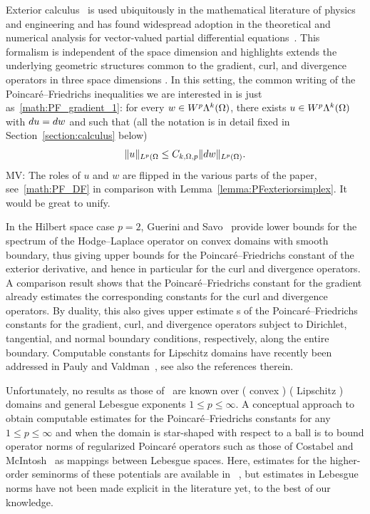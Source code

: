 \documentclass[10pt,a4paper]{article}
\newcommand\cye[1]{%
\protect\leavevmode
\begingroup
    \color{blue}%
    #1%
\endgroup
}
\newcommand{\mwl}[1]{{\color{red}#1}}
\begin{document}
Exterior calculus~\cite{greub1967multilinear,lee2012smooth} is used ubiquitously in the mathematical literature of physics and engineering and has found widespread adoption in the theoretical and numerical analysis for vector-valued partial differential equations~\cite{hiptmair2002finite, gross2004electromagnetic, arnold2006finite, arnold2009geometric, arnold2010finite, demlow2014posteriori, licht2021local, arnold2021complexes}. 
This formalism is independent of the \cye{space} dimension and highlights \cye{extends the} underlying geometric structures common to the gradient, curl, and divergence operators \cye{in three space dimensions}.
\cye{In this setting, the common writing of the Poincar\'e--Friedrichs inequalities we are interested in is just as~\eqref{math:PF_gradient_1}: for every $w \in W^{p}\Lambda^{k}(\Omega)$, there exists $u \in W^{p}\Lambda^{k}(\Omega)$ with $d u = d w$ and such that (all the notation is in detail fixed in Section~\ref{section:calculus} below)
\begin{align} \label{math:PF_DF} 
    \| u \|_{L^{p}(\Omega} \leq  C_{k,\Omega,p} \| d w \|_{L^{p}(\Omega)}.
\end{align} 
}\mwl{MV: The roles of $u$ and $w$ are flipped in the various parts of the paper, see~\eqref{math:PF_DF} in comparison with Lemma~\ref{lemma:PFexteriorsimplex}. It would be great to unify.}

In the Hilbert space case $p=2$, Guerini and Savo~\cite{guerini2004eigenvalue} provide lower bounds for the spectrum of the Hodge--Laplace operator on convex domains with smooth boundary, thus giving upper bounds for the Poincar\'e--Friedrichs constant of the exterior derivative, and hence \cye{in particular} for the curl and divergence operators.
\cye{A comparison result} shows that the Poincar\'e--Friedrichs constant for the gradient already estimates the corresponding constants for the curl and divergence operators. By duality, this also \cye{gives} upper estimate\cye{s} of the Poincar\'e--Friedrichs constants for the gradient, curl, and divergence \cye{operators} subject to Dirichlet, tangential, and normal boundary conditions, respectively, along the entire boundary. 
\cye{Computable constants for Lipschitz domains have recently been addressed in Pauly and Valdman~\cite{Paul_Vald_PF_grad_curl_div_20}, see also the references therein.}

Unfortunately, no results as those of~\cite{guerini2004eigenvalue, Paul_Vald_PF_grad_curl_div_20} are known over \cye{(}convex\cye{)} \cye{(}Lipschitz\cye{)} domains and general Lebesgue exponents $1 \leq p \leq \infty$. 
\cye{A conceptual approach to obtain computable} estimates for the Poincar\'e--Friedrichs constants \cye{for any $1 \leq p \leq \infty$} and when the domain is star-shaped with respect to a ball is to bound operator norms of regularized Poincar\'e operators \cye{such as those of} Costabel and McIntosh~\cite{costabel2010bogovskiui} as mappings between Lebesgue spaces. 
Here, estimates for the higher-order seminorms of these potentials \cye{are available in}~\cite{guzman2021estimation}, but estimates in Lebesgue norms have not been made explicit in the literature yet, to the best of our knowledge.
\end{document}
